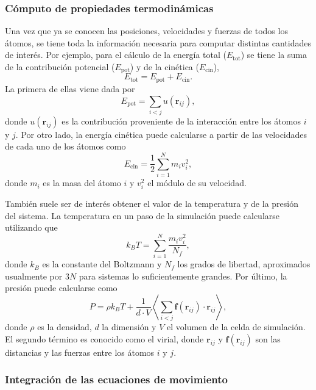 \subsubsection{Cómputo de propiedades termodinámicas}

Una vez que ya se conocen las posiciones, velocidades y fuerzas de todos los 
átomos, se tiene toda la información necesaria para computar distintas cantidades 
de interés. Por ejemplo, para el cálculo de la energía total ($E_{\text{tot}}$) 
se tiene la suma de la contribución potencial ($E_{\text{pot}}$) y de la cinética
($E_{\text{cin}}$),
\begin{equation}
    E_{\text{tot}} = E_{\text{pot}} + E_{\text{cin}}.
\end{equation}
La primera de ellas viene dada por 
\begin{equation}
    E_{\text{pot}} = \sum_{i < j} u(\mathbf{r}_{ij}),
\end{equation}
donde $u(\mathbf{r}_{ij})$ es la contribución proveniente de la interacción 
entre los átomos $i$ y $j$. Por otro lado, la energía cinética puede calcularse a
partir de las velocidades de cada uno de los átomos como
\begin{equation}
    E_{\text{cin}} = \frac{1}{2} \sum_{i=1}^{N} m_i v_i^2, 
\end{equation}
donde $m_i$ es la masa del átomo $i$ y $v_i^2$ el módulo de su velocidad. 

También suele ser de interés obtener el valor de la temperatura y de la presión
del sistema. La temperatura en un paso de la simulación puede calcularse 
utilizando que
\begin{equation}\label{eq:tempvel}
    k_B T = \sum_{i=1}^N \frac{m_i v_i^2}{N_f},
\end{equation}
donde $k_B$ es la constante del Boltzmann y $N_f$ los grados de libertad,
aproximados usualmente por $3N$ para sistemas lo suficientemente grandes. Por 
último, la presión puede calcularse como 
\begin{equation}
P = \rho k_B T + \frac{1}{d \cdot V} \left\langle \sum_{i<j} \mathbf{f}(\mathbf{r}_{ij}) \cdot \mathbf{r}_{ij} \right\rangle,
\end{equation}
donde $\rho$ es la densidad, $d$ la dimensión y $V$ el volumen de la celda de 
simulación. El segundo término es conocido como el virial, donde $\mathbf{r}_{ij}$ 
y $\mathbf{f}(\mathbf{r}_{ij})$ son las distancias y las fuerzas entre los átomos $i$ y $j$.


\subsubsection{Integración de las ecuaciones de movimiento}

